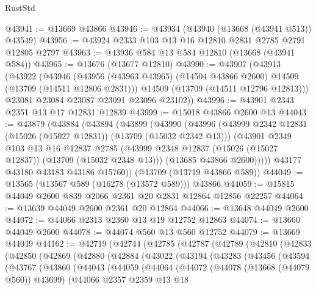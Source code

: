 \begin{lexlean}{RustStd}
\begin{coremodule}
@43941 := @13669 @43866
@43946 := @43934 (@43940 (@13668 (@43941 @513)) @43549)
@43956 := @43924 @2333 @103 @13 @16 @12810 @2831 @2785 @2791 @12805 @2797
@43963 := @43936 @584 @13 @584 @12810 (@13668 (@43941 @584))
@43965 := @13676 (@13677 @12810)
@43990 := @43907
    (@43913
      (@43922
        (@43946
          (@43956 (@43963 @43965) (@14504 @43866 @2600) @14509 (@13709 (@14511 @12806 @2831)))
          @14509
          (@13709 (@14511 @12796 @12813)))
        @23081
        @23084
        @23087
        @23091
        @23096
        @23102))
@43996 := @43901 @2343 @2351 @13 @17 @12831 @12839
@43999 := @15018 @43866 @2600 @13
@44043 := @43879
    (@43884
      (@43894
        (@43899
          (@43990
            (@43996
              (@43999 @2342 @12831 (@15026 (@15027 @12831)) (@13709 (@15032 @2342 @13)))
              (@43901
                @2349
                @103
                @13
                @16
                @12837
                @2785
                (@43999 @2348 @12837 (@15026 (@15027 @12837)) (@13709 (@15032 @2348 @13)))
                (@13685 @43866 @2600)))))
        @43177
        @43180
        @43183
        @43186
        @15760))
    (@13709 (@13719 @43866 @589))
@44049 := @13565 (@13567 @589 (@16278 (@13572 @589))) @43866
@44059 := @15815 @44049 @2600 @839 @2066 @2361 @20 @2831 @12864 @12856 @22257
@44064 := @13639 @44049 @2600 @2361 @20 @12864
@44066 := @13648 @44049 @2600
@44072 := @44066 @2313 @2360 @13 @19 @12752 @12863
@44074 := @13660 @44049 @2600
@44078 := @44074 @560 @13 @560 @12752
@44079 := @13669 @44049
@44162 := @42719
    (@42744
      (@42785
        (@42787
          (@42789
            (@42810
              (@42833
                (@42850
                  (@42869
                    (@42880
                      (@42884
                        (@43022
                          (@43194
                            (@43283
                              (@43456
                                (@43594
                                  (@43767
                                    (@43860
                                      (@44043
                                        (@44059
                                          (@44064
                                            (@44072
                                              (@44078 (@13668 (@44079 @560)) @43699)
                                              (@44066
                                                @2357
                                                @2359
                                                @13
                                                @18

\end{coremodule}
\end{lexlean}

